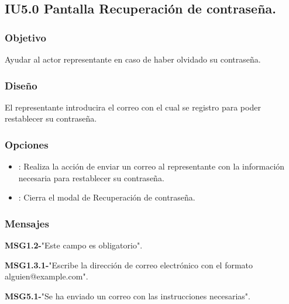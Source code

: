 \subsection{IU5.0 Pantalla Recuperación de contraseña.}

\subsubsection{Objetivo}
	Ayudar al actor representante en caso de haber olvidado su contraseña.

\subsubsection{Diseño}
	El representante introducira el correo con el cual se registro para poder restablecer su contraseña.

\subsubsection{Opciones}
\begin{itemize}
	\item {}: Realiza la acción de enviar un correo al representante con la información necesaria para restablecer su contraseña.
	\item {}: Cierra el modal de Recuperación de contraseña.
  \end{itemize}

\subsubsection{Mensajes}
	\begin{Citemize}
		\item {\bf MSG1.2-}"Este campo es obligatorio".
		\item {\bf MSG1.3.1-}"Escribe la dirección de correo electrónico con el formato alguien@example.com".
		\item {\bf MSG5.1-}"Se ha enviado un correo con las instrucciones necesarias".
	\end{Citemize}